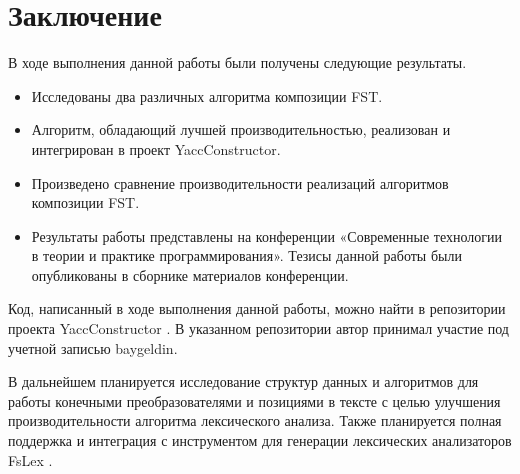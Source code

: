 \section*{Заключение}
В ходе выполнения данной работы были получены следующие результаты.

\begin{itemize}
  \item Исследованы два различных алгоритма композиции FST.
  \item Алгоритм, обладающий лучшей производительностью, реализован и интегрирован в проект YaccConstructor.
  \item Произведено сравнение производительности реализаций алгоритмов композиции FST.
  \item Результаты работы представлены на конференции «Современные технологии в теории и практике программирования». Тезисы данной работы были опубликованы в сборнике материалов конференции.
\end{itemize} 

Код, написанный в ходе выполнения данной работы, можно найти в репозитории проекта YaccConstructor \cite{yacc_git}. В указанном репозитории автор принимал участие под учетной записью baygeldin.

В дальнейшем планируется исследование структур данных и алгоритмов для работы конечными преобразователями и позициями в тексте с целью улучшения производительности алгоритма лексического анализа. Также планируется полная поддержка и интеграция с инструментом для генерации лексических анализаторов FsLex \cite{fslex}.

